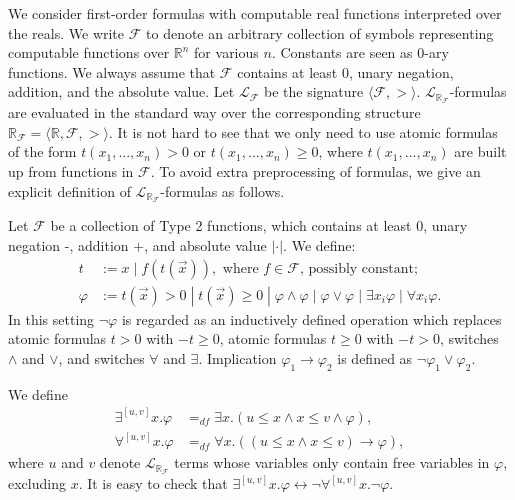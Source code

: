 \documentclass[envcountsect]{llncs}
\newcommand{\lrf}{\mathcal{L}_{\mathbb{R}_{\mathcal{F}}}}
\begin{document}
We consider first-order formulas with computable real functions interpreted
over the reals. We write $\mathcal{F}$ to denote an arbitrary collection of
symbols representing computable functions over $\mathbb{R}^n$ for various
$n$. Constants are seen as 0-ary functions. We always assume that
$\mathcal{F}$ contains at least $0$, unary negation, addition, and
the absolute value.  Let $\mathcal{L_{\mathcal{F}}}$ be the signature $\langle
\mathcal{F}, >\rangle$. $\lrf$-formulas are evaluated in the standard way over
the corresponding structure $\mathbb{R}_{\mathcal{F}}= \langle \mathbb{R},
\mathcal{F}, >\rangle$.  It is
not hard to see that we only need to use atomic formulas of the form
$t(x_1,...,x_n)>0$ or $t(x_1,...,x_n)\geq 0$, where $t(x_1,...,x_n)$ are built
up from functions in $\mathcal{F}$. To avoid extra preprocessing of formulas, we
give an explicit definition of $\lrf$-formulas as follows.
\begin{definition}[$\lrf$-Formulas]
Let $\mathcal{F}$ be a collection of Type 2 functions, which contains at least
$0$, unary negation -, addition $+$, and absolute value $|\cdot|$. We define:
\begin{align*}
t& := x \; | \; f(t(\vec x)), \mbox{ where }f\in \mathcal{F}\mbox{, possibly
constant};\\
\varphi& := t(\vec x)> 0 \; | \; t(\vec x)\geq 0 \; | \; \varphi\wedge\varphi
\; | \; \varphi\vee\varphi \; | \; \exists x_i\varphi \; |\; \forall x_i\varphi.
\end{align*}
In this setting $\neg\varphi$ is regarded as an inductively defined operation
which replaces atomic formulas $t>0$ with $-t\geq 0$, atomic formulas $t\geq 0$
with $-t>0$, switches $\wedge$ and $\vee$, and switches $\forall$ and $\exists$.
Implication $\varphi_1\rightarrow\varphi_2$ is defined as
$\neg\varphi_1\vee\varphi_2$.
\end{definition}
\begin{definition}
We define
\begin{align*}
\exists^{[u,v]}x.\varphi &=_{df}\exists x. ( u \leq x \land x \leq v \wedge
\varphi),\\
\forall^{[u,v]}x.\varphi &=_{df} \forall x. ( (u \leq x \land x \leq v)
\rightarrow \varphi),
\end{align*}
where $u$ and $v$ denote $\lrf$ terms whose variables only
contain free variables in $\varphi$, excluding $x$. It is easy to check that
$\exists^{[u,v]}x. \varphi \leftrightarrow \neg \forall^{[u,v]}x. \neg\varphi$.
\end{definition}
\end{document}
